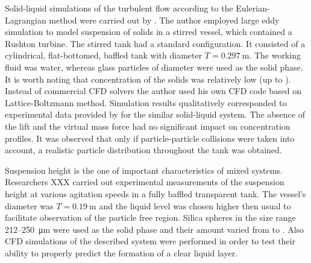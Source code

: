 Solid-liquid simulations of the turbulent flow according to the Eulerian-Lagrangian method were carried out by \citet{derk03}. The author employed large eddy simulation to model suspension of solids in a stirred vessel, which contained a Rushton turbine. The stirred tank had a standard configuration. It consisted of a cylindrical, flat-bottomed, baffled tank with diameter $T=\SI{0.297}{\meter}$. The working fluid was water, whereas glass particles of diameter were used as the solid phase. It is worth noting that concentration of the solids was relatively low (up to ). Instead of commercial CFD solvers the author used his own CFD code based on Lattice-Boltzmann method. Simulation results qualitatively corresponded to experimental data provided by \citet{miche03} for the similar solid-liquid system. The absence of the lift and the virtual mass force had no significant impact on concentration profiles. It was observed that only if particle-particle collisions were taken into account, a realistic particle distribution throughout the tank was obtained.

Suspension height is the one of important characteristics of mixed systems. Researchers XXX carried out experimental measurements of the suspension height at various agitation speeds in a fully baffled transparent tank. The vessel's diameter was $T=\SI{0.19}{\meter}$ and the liquid level was chosen higher then usual to facilitate observation of the particle free region. Silica spheres in the size range \num{212}--\SI{250}{\micro\meter} were used as the solid phase and their amount varied from  to . Also CFD simulations of the described system were performed in order to test their ability to properly predict the formation of a clear liquid layer.        